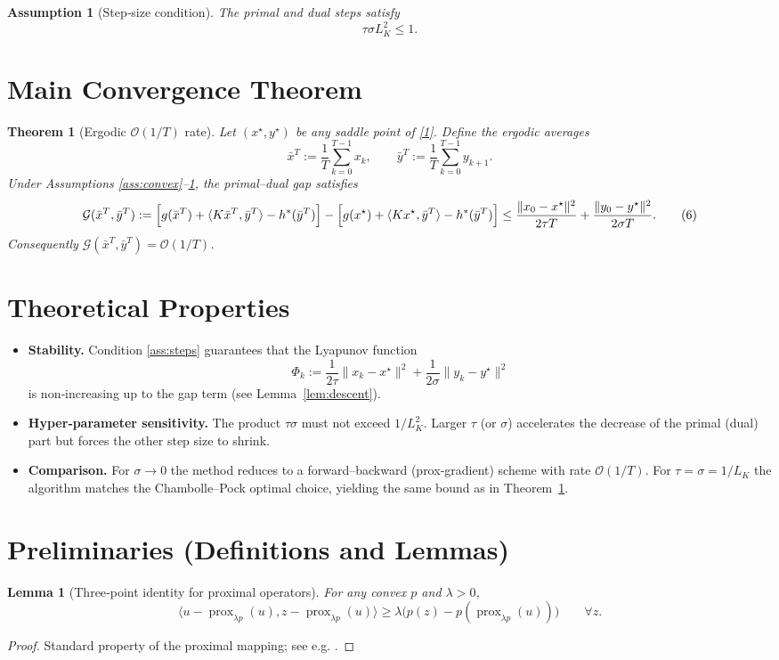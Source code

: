 \documentclass{article}
\newtheorem{theorem}{Theorem}
\newtheorem{lemma}{Lemma}
\newtheorem{assumption}{Assumption}
\newcommand{\prox}{\operatorname{prox}}
\newcommand{\inner}[2]{\langle #1,#2\rangle}
\begin{document}
\begin{assumption}[Step‑size condition]
\label{ass:steps}
The primal and dual steps satisfy
\[
\tau\sigma L_{K}^{2}\le 1.
\tag{5}
\]
\end{assumption}

\section*{Main Convergence Theorem}
\begin{theorem}[Ergodic $\mathcal O(1/T)$ rate]\label{thm:rate}
Let $(x^{\star},y^{\star})$ be any saddle point of \eqref{1}.
Define the ergodic averages
\[
\bar x^{T}:=\frac{1}{T}\sum_{k=0}^{T-1}x_{k},\qquad
\bar y^{T}:=\frac{1}{T}\sum_{k=0}^{T-1}y_{k+1}.
\]
Under Assumptions \ref{ass:convex}–\ref{ass:steps}, the primal–dual gap satisfies
\[
\mathcal G(\bar x^{T},\bar y^{T})
:=\Bigl[g(\bar x^{T})+ \langle K\bar x^{T},\bar y^{T}\rangle- h^{*}(\bar y^{T})\Bigr]
 -\Bigl[g(x^{\star})+ \langle Kx^{\star},\bar y^{T}\rangle- h^{*}(\bar y^{T})\Bigr]
 \le
\frac{\|x_{0}-x^{\star}\|^{2}}{2\tau T}
+\frac{\|y_{0}-y^{\star}\|^{2}}{2\sigma T}.
\tag{6}
\]
Consequently $\mathcal G(\bar x^{T},\bar y^{T})= \mathcal O(1/T)$.
\end{theorem}

\section*{Theoretical Properties}
\begin{itemize}
\item \textbf{Stability.} Condition \eqref{ass:steps} guarantees that the
Lyapunov function 
\[
\Phi_{k}:=\frac{1}{2\tau}\|x_{k}-x^{\star}\|^{2}
          +\frac{1}{2\sigma}\|y_{k}-y^{\star}\|^{2}
\]
is non‑increasing up to the gap term (see Lemma~\ref{lem:descent}).
\item \textbf{Hyper‑parameter sensitivity.} The product $\tau\sigma$ must not exceed $1/L_{K}^{2}$.
Larger $\tau$ (or $\sigma$) accelerates the decrease of the primal (dual) part but forces the other step size to shrink.
\item \textbf{Comparison.}
For $\sigma\to0$ the method reduces to a forward–backward (prox‑gradient) scheme with rate $\mathcal O(1/T)$.
For $\tau=\sigma=1/L_{K}$ the algorithm matches the Chambolle–Pock optimal choice, yielding the same bound as in Theorem~\ref{thm:rate}.
\end{itemize}

\section*{Preliminaries (Definitions and Lemmas)}
\begin{lemma}[Three‑point identity for proximal operators]\label{lem:prox}
For any convex $p$ and $\lambda>0$,
\[
\inner{u-\prox_{\lambda p}(u)}{z-\prox_{\lambda p}(u)}
\ge \lambda\bigl(p(z)-p(\prox_{\lambda p}(u))\bigr)
\qquad\forall z .
\tag{7}
\]
\end{lemma}
\begin{proof}
Standard property of the proximal mapping; see e.g. \cite{parikh2014prox}.
\end{proof}
\end{document}
